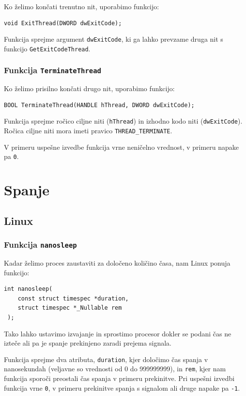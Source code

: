 \documentclass[a4paper,12pt,openright]{book}
\begin{document}
Ko želimo končati trenutno nit, uporabimo funkcijo:
\begin{lstlisting}[style=func]
 void ExitThread(DWORD dwExitCode);
\end{lstlisting}

Funkcija sprejme argument \texttt{dwExitCode}, ki ga lahko prevzame druga nit s funkcijo \texttt{GetExitCodeThread}.

\subsubsection{Funkcija \texttt{TerminateThread}}

Ko želimo prisilno končati drugo nit, uporabimo funkcijo:
\begin{lstlisting}[style=func]
 BOOL TerminateThread(HANDLE hThread, DWORD dwExitCode);
\end{lstlisting}

Funkcija sprejme ročico ciljne niti (\texttt{hThread}) in izhodno kodo niti (\texttt{dwExit\-Code}).
Ročica ciljne niti mora imeti pravico \texttt{THREAD\_TERMINATE}.

V primeru uspešne izvedbe funkcija vrne neničelno vrednost, v primeru napake pa \texttt{0}.

\section{Spanje}

\subsection{Linux}

\subsubsection{Funkcija \texttt{nanosleep}}

Kadar želimo proces zaustaviti za določeno količino časa, nam Linux ponuja funkcijo:
\begin{lstlisting}[style=func]
 int nanosleep(
	const struct timespec *duration,
	struct timespec *_Nullable rem
 );
\end{lstlisting}
Tako lahko ustavimo izvajanje in sprostimo procesor dokler se podani čas ne izteče ali pa je spanje prekinjeno zaradi prejema signala.

Funkcija sprejme dva atributa, \texttt{duration}, kjer določimo čas spanja v nanosekundah (veljavne so vrednosti od 0 do 999999999), in \texttt{rem}, kjer nam funkcija sporoči preostali čas spanja v primeru prekinitve.
Pri uspešni izvedbi funkcija vrne \texttt{0}, v primeru prekinitve spanja s signalom ali druge napake pa \texttt{-1}.
\end{document}
